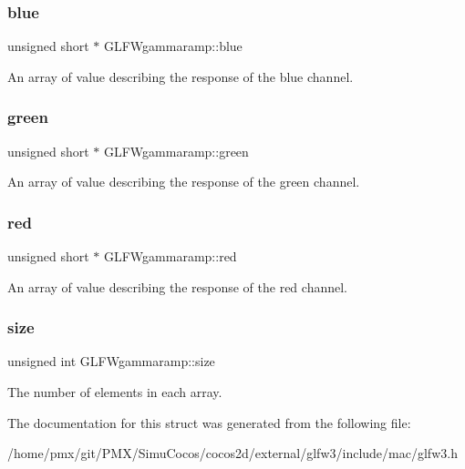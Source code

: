 \subsubsection{\texorpdfstring{blue}{blue}}
{\footnotesize\ttfamily unsigned short $\ast$ G\+L\+F\+Wgammaramp\+::blue}

An array of value describing the response of the blue channel. \mbox{\label{structGLFWgammaramp_acea1bf88573f37cb0583a0fc005bbd0c}} 
\subsubsection{\texorpdfstring{green}{green}}
{\footnotesize\ttfamily unsigned short $\ast$ G\+L\+F\+Wgammaramp\+::green}

An array of value describing the response of the green channel. \mbox{\label{structGLFWgammaramp_a87eabbc644cdb77145caf4a0a1b5d9bd}} 
\subsubsection{\texorpdfstring{red}{red}}
{\footnotesize\ttfamily unsigned short $\ast$ G\+L\+F\+Wgammaramp\+::red}

An array of value describing the response of the red channel. \mbox{\label{structGLFWgammaramp_ad620e1cffbff9a32c51bca46301b59a5}} 
\subsubsection{\texorpdfstring{size}{size}}
{\footnotesize\ttfamily unsigned int G\+L\+F\+Wgammaramp\+::size}

The number of elements in each array. 

The documentation for this struct was generated from the following file\+:\begin{DoxyCompactItemize}
\item 
/home/pmx/git/\+P\+M\+X/\+Simu\+Cocos/cocos2d/external/glfw3/include/mac/glfw3.\+h\end{DoxyCompactItemize}
